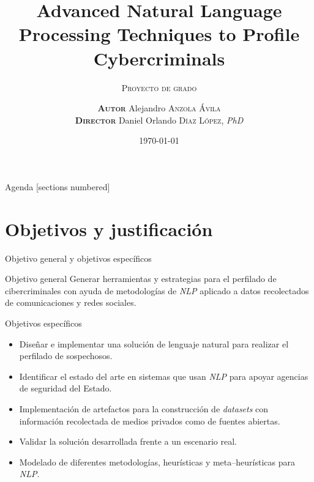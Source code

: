 \documentclass[10pt]{beamer}
\title{Advanced Natural Language Processing Techniques to Profile Cybercriminals}
\subtitle{\textsc{Proyecto de grado}}
\date{\today}
\author{\textsc{\scriptsize \textbf{Autor}} Alejandro \textsc{Anzola \'Avila}\\
  \textsc{\scriptsize \textbf{Director}} Daniel Orlando \textsc{D\'{\i}az L\'opez}, \textit{PhD}}
\institute{Escuela Colombiana de Ingenier\'{\i}a Julio Garavito}
\begin{document}

\maketitle

\begin{frame}{Agenda}
  [sections numbered]
  \tableofcontents
\end{frame}

\section{Objetivos y justificación}

\begin{frame}[allowframebreaks]{Objetivo general y objetivos específicos}

  \begin{alertblock}{Objetivo general}
    Generar herramientas y estrategias para el perfilado de cibercriminales con ayuda de metodologías de \emph{NLP} aplicado a datos recolectados de comunicaciones y redes sociales.
  \end{alertblock}

  \begin{alertblock}{Objetivos específicos}
    \begin{itemize}
      \item Diseñar e implementar una solución de lenguaje natural para realizar el perfilado de sospechosos.

      \item Identificar el estado del arte en sistemas que usan \emph{NLP} para apoyar agencias de seguridad del Estado.

      \item Implementación de artefactos para la construcción de \emph{datasets} con información recolectada de medios privados como de fuentes abiertas.

      \item Validar la solución desarrollada frente a un escenario real.

      \item Modelado de diferentes metodologías, heurísticas y meta--heurísticas para \emph{NLP}.
    \end{itemize}
  \end{alertblock}
  
\end{frame}
\end{document}
